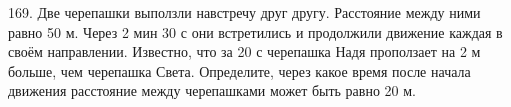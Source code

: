 169. Две черепашки выползли навстречу друг другу. Расстояние между ними равно 50 м. Через 2 мин 30 с они встретились и продолжили движение каждая в своём направлении. Известно, что за 20 с черепашка Надя проползает на 2 м больше, чем черепашка Света. Определите, через какое время после начала движения расстояние между черепашками может быть равно 20 м.\\
